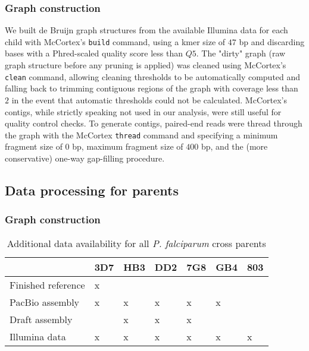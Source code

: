 \subsubsection{Graph construction}

We built de Bruijn graph structures from the available Illumina data for each child with McCortex's \texttt{build} command, using a kmer size of $47$ bp and discarding bases with a Phred-scaled quality score\cite{Brockman:2008p231} less than $Q5$.  The "dirty" graph (raw graph structure before any pruning is applied) was cleaned using McCortex's \texttt{clean} command, allowing cleaning thresholds to be automatically computed and falling back to trimming contiguous regions of the graph with coverage less than $2$ in the event that automatic thresholds could not be calculated.  McCortex's contigs, while strictly speaking not used in our analysis, were still useful for quality control checks.  To generate contigs, paired-end reads were thread through the graph with the McCortex \texttt{thread} command and specifying a minimum fragment size of $0$ bp, maximum fragment size of $400$ bp, and the (more conservative) one-way gap-filling procedure.

\subsection{Data processing for parents}

\subsubsection{Graph construction}

\begin{table}[b]
\centering
\caption{Additional data availability for all \textit{P. falciparum} cross parents}
\label{tbl:reflist}
\begin{tabular}{@{}lllllll@{}}
\toprule
                   & 3D7 & HB3 & DD2 & 7G8 & GB4 & 803 \\ \midrule
Finished reference & x   &     &     &     &     &     \\
PacBio assembly    & x   & x   & x   & x   & x   &     \\
Draft assembly     &     & x   & x   & x   &     &     \\
Illumina data      & x   & x   & x   & x   & x   & x   \\ \bottomrule
\end{tabular}
\end{table}

